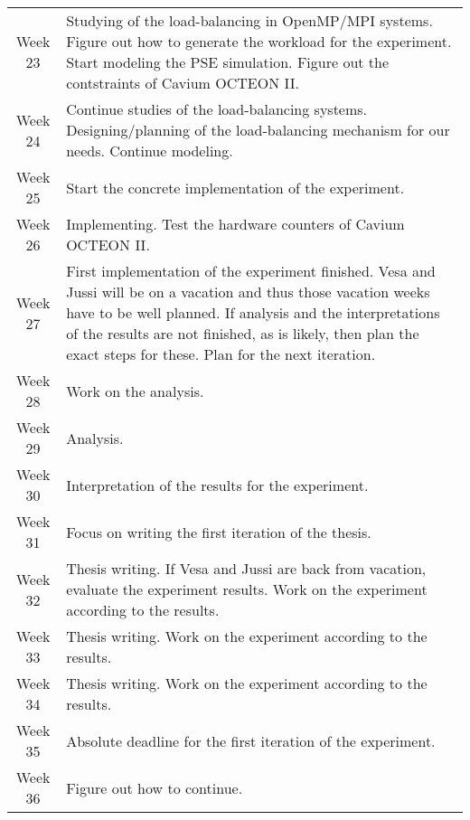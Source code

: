 \begin{table}[h]
  \centering
  \begin{tabular}{@{}c|p{10cm}@{}}
    \toprule
    Week 23 & Studying of the load-balancing in OpenMP/MPI systems. Figure out how to generate the workload for the experiment. Start modeling the PSE simulation. Figure out the contstraints of Cavium OCTEON II. \\
    Week 24 & Continue studies of the load-balancing systems. Designing/planning of the load-balancing mechanism for our needs. Continue modeling. \\
    Week 25 & Start the concrete implementation of the experiment. \\
    Week 26 & Implementing. Test the hardware counters of Cavium OCTEON II. \\
    Week 27 & First implementation of the experiment finished. Vesa and Jussi will be on a vacation and thus those vacation weeks have to be well planned. If analysis and the interpretations of the results are not finished, as is likely, then plan the exact steps for these. Plan for the next iteration. \\
    Week 28 & Work on the analysis. \\
    Week 29 & Analysis. \\
    Week 30 & Interpretation of the results for the experiment. \\
    Week 31 & Focus on writing the first iteration of the thesis. \\
    Week 32 & Thesis writing. If Vesa and Jussi are back from vacation, evaluate the experiment results. Work on the experiment according to the results. \\
    Week 33 & Thesis writing. Work on the experiment according to the results. \\
    Week 34 & Thesis writing. Work on the experiment according to the results. \\
    Week 35 & Absolute deadline for the first iteration of the experiment.  \\
    Week 36 & Figure out how to continue. \\

    \bottomrule
  \end{tabular}
\end{table}

